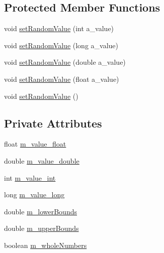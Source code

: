 \subsection*{Protected Member Functions}
\begin{DoxyCompactItemize}
\item 
void \hyperlink{classorg_1_1jgap_1_1gp_1_1terminal_1_1_terminal_a7a6569bd6115c6bf3ecda835f7582ebf}{set\-Random\-Value} (int a\-\_\-value)
\item 
void \hyperlink{classorg_1_1jgap_1_1gp_1_1terminal_1_1_terminal_a1dec092bedb3d27badf9799a7f0e3068}{set\-Random\-Value} (long a\-\_\-value)
\item 
void \hyperlink{classorg_1_1jgap_1_1gp_1_1terminal_1_1_terminal_a448ef576fed68265aabce86e6ce43404}{set\-Random\-Value} (double a\-\_\-value)
\item 
void \hyperlink{classorg_1_1jgap_1_1gp_1_1terminal_1_1_terminal_aae08a7b218d592bade89080094505862}{set\-Random\-Value} (float a\-\_\-value)
\item 
void \hyperlink{classorg_1_1jgap_1_1gp_1_1terminal_1_1_terminal_a1d1d06f2718aad467d907f9377bd2338}{set\-Random\-Value} ()
\end{DoxyCompactItemize}
\subsection*{Private Attributes}
\begin{DoxyCompactItemize}
\item 
float \hyperlink{classorg_1_1jgap_1_1gp_1_1terminal_1_1_terminal_a99b2ee9efce4331568ae6d3c8b71da24}{m\-\_\-value\-\_\-float}
\item 
double \hyperlink{classorg_1_1jgap_1_1gp_1_1terminal_1_1_terminal_a8f05c32e1bfe23e4c3dcdbfdf47f14f2}{m\-\_\-value\-\_\-double}
\item 
int \hyperlink{classorg_1_1jgap_1_1gp_1_1terminal_1_1_terminal_a8bffe6ee323e915c336df2da5dd6d769}{m\-\_\-value\-\_\-int}
\item 
long \hyperlink{classorg_1_1jgap_1_1gp_1_1terminal_1_1_terminal_a334d28b40cf6496f5669690e219cdb70}{m\-\_\-value\-\_\-long}
\item 
double \hyperlink{classorg_1_1jgap_1_1gp_1_1terminal_1_1_terminal_a80247457d366bbbd917324be5fed2a83}{m\-\_\-lower\-Bounds}
\item 
double \hyperlink{classorg_1_1jgap_1_1gp_1_1terminal_1_1_terminal_a8fc7ed948d76ce53152b5354cf02cf12}{m\-\_\-upper\-Bounds}
\item 
boolean \hyperlink{classorg_1_1jgap_1_1gp_1_1terminal_1_1_terminal_ae820d0c745ec6234ecd0800fe39b66d4}{m\-\_\-whole\-Numbers}
\end{DoxyCompactItemize}
